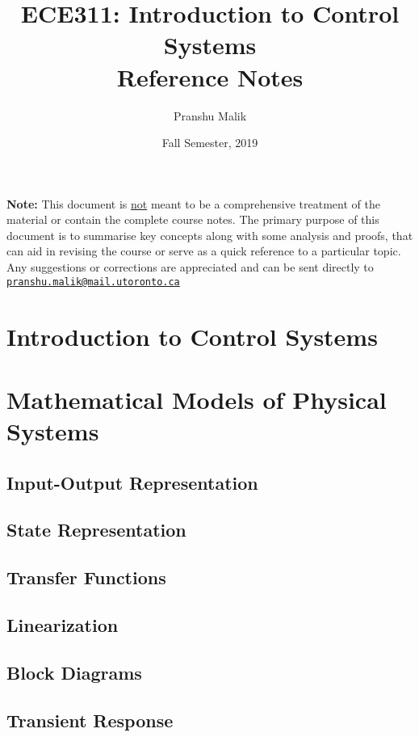 \documentclass[10pt]{article}
\date{Fall Semester, 2019}
\begin{document}
\title{\textbf{\Large{\textsc{ECE311:} Introduction to Control Systems}} \\ \Large{Reference Notes}\vspace{-0.3cm}}
\author{Pranshu Malik}

\maketitle
\tableofcontents
\blfootnote
{
    \textbf{Note:} This document is \underline{not} meant to be a comprehensive treatment of the material 
    or contain the complete course notes. The primary purpose of this document is to summarise key concepts
    along with some analysis and proofs, that can aid in revising the course or serve as a quick reference 
    to a particular topic. Any suggestions or corrections are appreciated and can be
    sent directly to \texttt{\href{mailto:pranshu.malik@mail.utoronto.ca}{pranshu.malik@mail.utoronto.ca}}
}

\section{Introduction to Control Systems}

\section{Mathematical Models of Physical Systems}
\subsection{Input-Output Representation}
\subsection{State Representation}
\subsection{Transfer Functions}
\subsection{Linearization}
\subsection{Block Diagrams}
\subsection{Transient Response}
\end{document}
